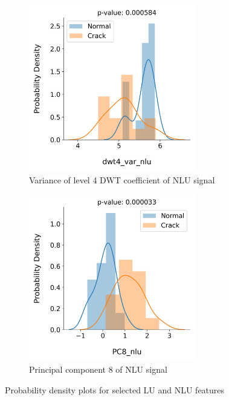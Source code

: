\begin{figure}[tb]
\begin{subfigure}[t]{0.49\linewidth}
    \centering
    \includegraphics[width=0.8\textwidth]{fig/crack_detection_dwt4_var_nlu.png}
    \caption{Variance of level 4 DWT coefficient of NLU signal}
  \end{subfigure}
  \begin{subfigure}[t]{0.49\linewidth}
    \centering
    \includegraphics[width=0.8\textwidth]{fig/crack_detection_PC8_nlu.png}
    \caption{Principal component 8 of NLU signal}
  \end{subfigure}

  \caption{Probability density plots for selected LU and NLU features}
  \label{fig: crack detection feat dist}
\end{figure}